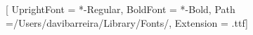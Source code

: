 \usepackage{fontspec}

\newfontfamily{}[
	UprightFont = *-Regular,
	BoldFont = *-Bold,
	Path =/Users/davibarreira/Library/Fonts/,
	Extension = .ttf]
\newfontface{}
\newfontface{}

